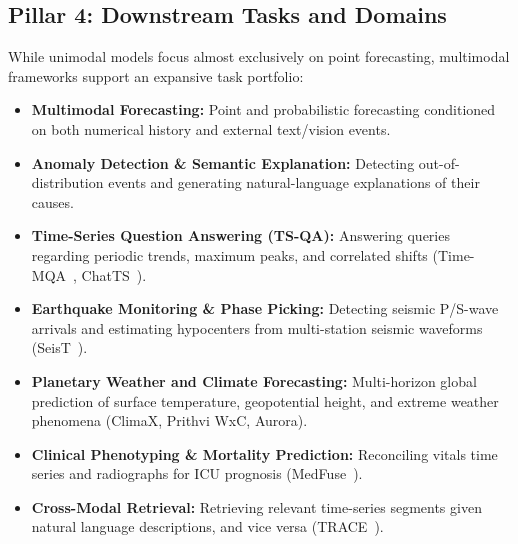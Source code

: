 \subsection{Pillar 4: Downstream Tasks and Domains}
While unimodal models focus almost exclusively on point forecasting, multimodal frameworks support an expansive task portfolio:
\begin{itemize}
    \item \textbf{Multimodal Forecasting:} Point and probabilistic forecasting conditioned on both numerical history and external text/vision events.
    \item \textbf{Anomaly Detection \& Semantic Explanation:} Detecting out-of-distribution events and generating natural-language explanations of their causes.
    \item \textbf{Time-Series Question Answering (TS-QA):} Answering queries regarding periodic trends, maximum peaks, and correlated shifts (Time-MQA~\cite{Shen2025TimeMQA}, ChatTS~\cite{Zhao2024ChatTS}).
    \item \textbf{Earthquake Monitoring \& Phase Picking:} Detecting seismic P/S-wave arrivals and estimating hypocenters from multi-station seismic waveforms (SeisT~\cite{Zhang2024SeisT}).
    \item \textbf{Planetary Weather and Climate Forecasting:} Multi-horizon global prediction of surface temperature, geopotential height, and extreme weather phenomena (ClimaX, Prithvi WxC, Aurora).
    \item \textbf{Clinical Phenotyping \& Mortality Prediction:} Reconciling vitals time series and radiographs for ICU prognosis (MedFuse~\cite{Hayat2022MedFuse}).
    \item \textbf{Cross-Modal Retrieval:} Retrieving relevant time-series segments given natural language descriptions, and vice versa (TRACE~\cite{Chen2025TRACE}).
\end{itemize}
